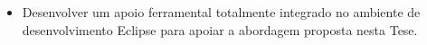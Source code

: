\begin{itemize}
	
	
	
    \item Desenvolver um apoio ferramental totalmente integrado no ambiente de desenvolvimento Eclipse para apoiar a abordagem proposta nesta Tese.

\end{itemize}






	
	
